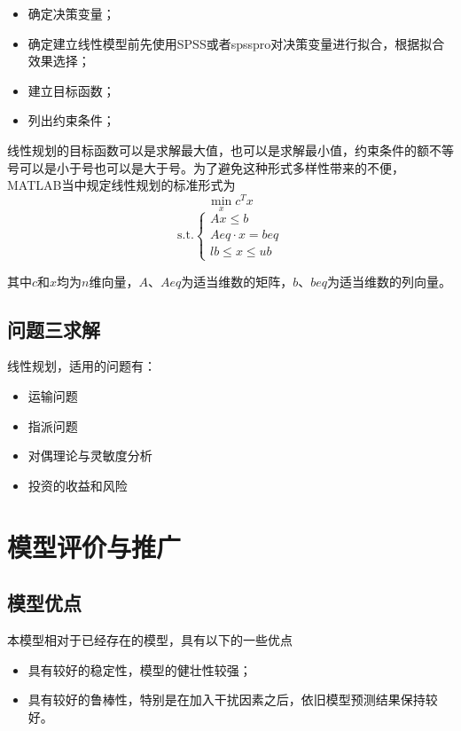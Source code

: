 \documentclass{suesmmthesis}
\begin{document}
    \begin{itemize}
        \item 确定决策变量；
        \item 确定建立线性模型前先使用SPSS或者spsspro对决策变量进行拟合，根据拟合效果选择；
        \item 建立目标函数；
        \item 列出约束条件；
    \end{itemize}

    线性规划的目标函数可以是求解最大值，也可以是求解最小值，约束条件的额不等号可以是小于号也可以是大于号。为了避免这种形式多样性带来的不便，MATLAB当中规定线性规划的标准形式为
    \begin{equation}
        \min\limits_{x}{c^{T}x}
    \end{equation}
    \begin{equation}
        \text{s.t.}\begin{cases}
            Ax\leq{b}\\
            Aeq\cdot{x}=beq\\
            lb\leq{x}\leq{ub}
        \end{cases}
    \end{equation}

    其中$c$和$x$均为$n$维向量，$A$、$Aeq$为适当维数的矩阵，$b$、$beq$为适当维数的列向量。
    \subsection{问题三求解}
    线性规划，适用的问题有：
    \begin{itemize}
        \item 运输问题
        \item 指派问题
        \item 对偶理论与灵敏度分析
        \item 投资的收益和风险
    \end{itemize}
    \section{模型评价与推广}
    \subsection{模型优点}
    本模型相对于已经存在的模型，具有以下的一些优点
    \begin{itemize}
        \item 具有较好的稳定性，模型的健壮性较强；
        \item 具有较好的鲁棒性，特别是在加入干扰因素之后，依旧模型预测结果保持较好。
    \end{itemize}
\end{document}
